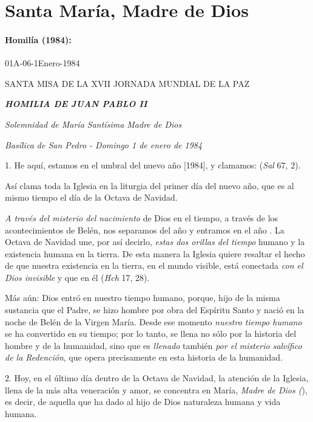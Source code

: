 \begin{body}
\begin{body}
	\end{body}

	\chapter{Santa María, Madre de Dios}

	\subsubsection{Homilía (1984):} 01A-06-1Enero-1984

	SANTA MISA DE LA XVII JORNADA MUNDIAL DE LA PAZ

	\emph{\textbf{HOMILIA DE JUAN PABLO II}}

	\emph{Solemnidad de María Santísima Madre de Dios}

	\emph{Basílica de San Pedro - Domingo 1 de enero de 1984}

	1. He aquí, estamos en el umbral del nuevo año {[}1984{]}, y clamamos:  (\emph{Sal} 67, 2).

	Así clama toda la Iglesia en la liturgia del primer día del nuevo año, que es al mismo tiempo el día de la Octava de Navidad.

	\emph{A través del misterio del nacimiento} de Dios en el tiempo, a través de los acontecimientos de Belén, nos separamos del año  y entramos en el año . La Octava de Navidad une, por así decirlo, \emph{estas dos orillas del tiempo} humano y la existencia humana en la tierra. De esta manera la Iglesia quiere resaltar el hecho de que nuestra existencia en la tierra, en el mundo visible, está conectada \emph{con el Dios invisible} y que en él  (\emph{Hch} 17, 28).

	Más aún: Dios entró en nuestro tiempo humano, porque, hijo de la misma sustancia que el Padre, se hizo hombre por obra del Espíritu Santo y nació en la noche de Belén de la Virgen María. Desde ese momento \emph{nuestro tiempo humano} se ha convertido en su tiempo; por lo tanto, se llena no sólo por la historia del hombre y de la humanidad, sino que es \emph{llenado} también \emph{por el misterio salvífico de la 	Redención}, que opera precisamente en esta historia de la humanidad.

	2. Hoy, en el último día dentro de la Octava de Navidad, la atención de la Iglesia, llena de la más alta veneración y amor, se concentra en María, \emph{Madre de Dios (}), es decir, de aquella que ha dado al hijo de Dios naturaleza humana y vida humana.


\end{body}
